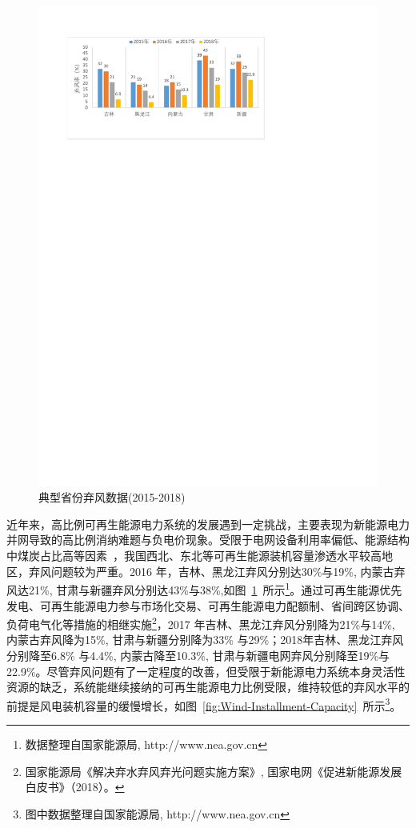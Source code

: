 \begin{figure}[H] %
  \centering
  \includegraphics[scale=0.95]{figures/Chap1-1-Wind-Curtailment-Province.pdf}
  \caption{典型省份弃风数据(2015-2018)}
  \label{fig:Wind-Curtailment-Province}
\end{figure}

近年来，高比例可再生能源电力系统的发展遇到一定挑战，主要表现为新能源电力并网导致的高比例消纳难题与负电价现象。受限于电网设备利用率偏低、能源结构中煤炭占比高等因素~\cite{Renewable-Consum-17}，我国西北、东北等可再生能源装机容量渗透水平较高地区，弃风问题较为严重。2016 年，吉林、黑龙江弃风分别达30\%与19\%, 内蒙古弃风达21\%, 甘肃与新疆弃风分别达43\%与38\%,如图~\ref{fig:Wind-Curtailment-Province}~所示\footnote{数据整理自国家能源局, http://www.nea.gov.cn}。通过可再生能源优先发电、可再生能源电力参与市场化交易、可再生能源电力配额制、省间跨区协调、负荷电气化等措施的相继实施\footnote{国家能源局《解决弃水弃风弃光问题实施方案》, 国家电网《促进新能源发展白皮书》（2018）。}，2017 年吉林、黑龙江弃风分别降为21\%与14\%, 内蒙古弃风降为15\%, 甘肃与新疆分别降为33\% 与29\%；2018年吉林、黑龙江弃风分别降至6.8\% 与4.4\%, 内蒙古降至10.3\%, 甘肃与新疆电网弃风分别降至19\%与22.9\%。尽管弃风问题有了一定程度的改善，但受限于新能源电力系统本身灵活性资源的缺乏，系统能继续接纳的可再生能源电力比例受限，维持较低的弃风水平的前提是风电装机容量的缓慢增长，如图~\ref{fig:Wind-Installment-Capacity}~所示\footnote{图中数据整理自国家能源局, http://www.nea.gov.cn}。

